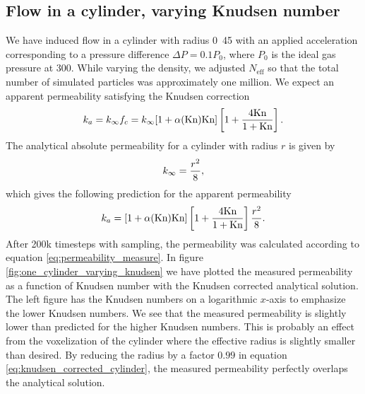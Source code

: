 \subsection{Flow in a cylinder, varying Knudsen number}
We have induced flow in a cylinder with radius \unit{0.45}{\micro\meter} with an applied acceleration corresponding to a pressure difference $\Delta P = 0.1P_0$, where $P_0$ is the ideal gas pressure at \unit{300}{\kelvin}. While varying the density, we adjusted $N_\text{eff}$ so that the total number of simulated particles was approximately one million. We expect an apparent permeability satisfying the Knudsen correction
\begin{align}
	k_a = k_\infty f_c = k_\infty[1 + \alpha(\text{Kn})\text{Kn}]\left[1 + {4\text{Kn}\over 1 + \text{Kn}}\right].
\end{align}
The analytical absolute permeability for a cylinder with radius $r$ is given by\cite{karniadakis2005microflows}
\begin{align}
	\label{eq:permeability_cylinder}
	k_\infty = {r^2\over 8},
\end{align}
which gives the following prediction for the apparent permeability
\begin{align}
    \label{eq:knudsen_corrected_cylinder}
	k_a = [1 + \alpha(\text{Kn})\text{Kn}]\left[1 + {4\text{Kn}\over 1 + \text{Kn}}\right] {r^2\over 8}.
\end{align}
After 200k timesteps with sampling, the permeability was calculated according to equation \ref{eq:permeability_measure}. In figure \ref{fig:one_cylinder_varying_knudsen} we have plotted the measured permeability as a function of Knudsen number with the Knudsen corrected analytical solution. The left figure has the Knudsen numbers on a logarithmic $x$-axis to emphasize the lower Knudsen numbers. We see that the measured permeability is slightly lower than predicted for the higher Knudsen numbers. This is probably an effect from the voxelization of the cylinder where the effective radius is slightly smaller than desired. By reducing the radius by a factor $0.99$ in equation \eqref{eq:knudsen_corrected_cylinder}, the measured permeability perfectly overlaps the analytical solution.

